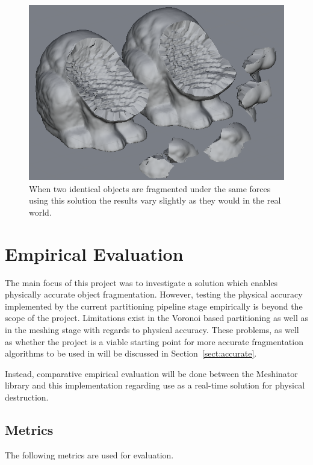 \begin{figure}
\centerline{\includegraphics[scale=0.7]{voxel_different.png}}
\caption{When two identical objects are fragmented under the same forces using this solution the results vary slightly as they would in the real world.}
\label{fig:4.7}
\end{figure}

\section{Empirical Evaluation}

\label{sect:emp}

The main focus of this project was to investigate a solution which enables physically accurate object fragmentation. However, testing the physical accuracy implemented by the current partitioning pipeline stage empirically is beyond the scope of the project. Limitations exist in the Voronoi based partitioning as well as in the meshing stage with regards to physical accuracy. These problems, as well as whether the project is a viable starting point for more accurate fragmentation algorithms to be used in will be discussed in Section~\ref{sect:accurate}.

Instead, comparative empirical evaluation will be done between the Meshinator library and this implementation regarding use as a real-time solution for physical destruction.

\subsection{Metrics}

The following metrics are used for evaluation.

